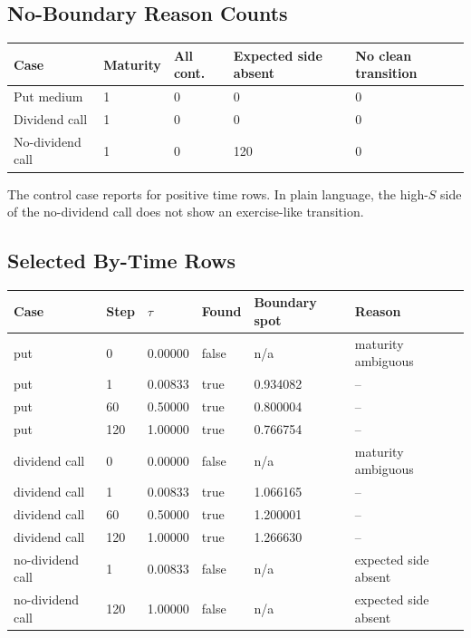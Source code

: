 \documentclass[11pt,a4paper]{article}
\begin{document}
\subsection{No-Boundary Reason Counts}

\begin{longtable}{L{0.28\textwidth}L{0.12\textwidth}L{0.12\textwidth}L{0.18\textwidth}L{0.14\textwidth}}
\toprule
Case & Maturity & All cont. & Expected side absent & No clean transition \\
\midrule
\endhead
Put medium & 1 & 0 & 0 & 0 \\
Dividend call & 1 & 0 & 0 & 0 \\
No-dividend call & 1 & 0 & 120 & 0 \\
\bottomrule
\end{longtable}

The control case reports  for positive time rows. In plain
language, the high-\(S\) side of the no-dividend call does not show an exercise-like transition.

\subsection{Selected By-Time Rows}

\begin{longtable}{L{0.25\textwidth}L{0.07\textwidth}L{0.09\textwidth}L{0.12\textwidth}L{0.16\textwidth}L{0.14\textwidth}}
\toprule
Case & Step & \(\tau\) & Found & Boundary spot & Reason \\
\midrule
\endhead
put & 0 & 0.00000 & false & n/a & maturity ambiguous \\
put & 1 & 0.00833 & true & 0.934082 & -- \\
put & 60 & 0.50000 & true & 0.800004 & -- \\
put & 120 & 1.00000 & true & 0.766754 & -- \\
dividend call & 0 & 0.00000 & false & n/a & maturity ambiguous \\
dividend call & 1 & 0.00833 & true & 1.066165 & -- \\
dividend call & 60 & 0.50000 & true & 1.200001 & -- \\
dividend call & 120 & 1.00000 & true & 1.266630 & -- \\
no-dividend call & 1 & 0.00833 & false & n/a & expected side absent \\
no-dividend call & 120 & 1.00000 & false & n/a & expected side absent \\
\bottomrule
\end{longtable}
\end{document}
